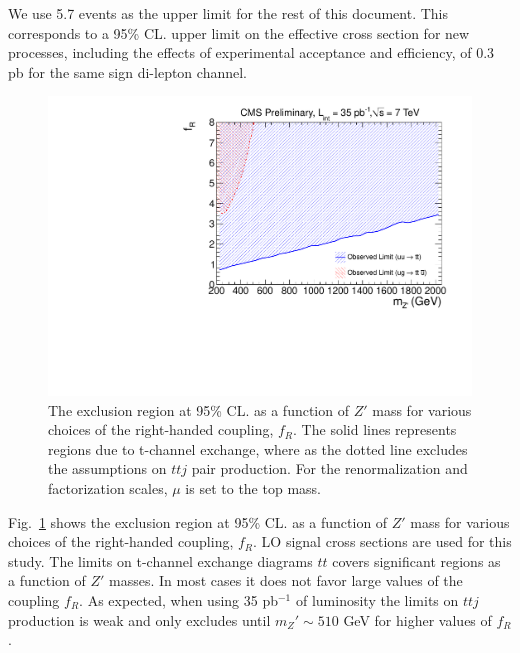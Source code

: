We use 5.7 events as the upper limit for the rest of this document. This corresponds to a 95\% CL.  
upper limit on the effective cross section for new processes, including the effects of experimental
acceptance and efficiency, of 0.3 pb for the same sign di-lepton channel.

\begin{figure}[htb]
\begin{center}
\includegraphics[width=0.7\linewidth]{figs/sstop_result.pdf}
\caption{ The exclusion region at 95\% CL. as a function of $Z'$ mass for various choices of the 
right-handed coupling, $f_R$. The solid lines represents regions due to t-channel exchange, where
as the dotted line excludes the assumptions on $ttj$ pair production. For the renormalization and factorization 
scales, $\mu$ is set to the top mass. \label{fig:sstopexclusion}}
\end{center}
\end{figure}

Fig.~\ref{fig:sstopexclusion} shows the exclusion region at 95\% CL. as a function of $Z'$ mass for 
various choices of the right-handed coupling, $f_R$. LO signal cross sections are used for this study. 
The limits on t-channel exchange diagrams $tt$ covers significant regions as a function of $Z'$ masses. 
In most cases it does not favor large values of the coupling $f_R$. As expected, when using 35 pb$^{-1}$ of luminosity 
the limits on $ttj$ production is weak and only excludes until $m_Z' \sim 510$ GeV for higher values of $f_R$.


